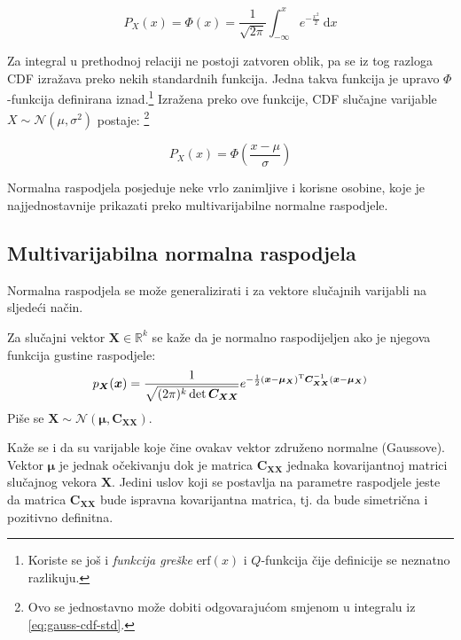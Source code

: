 \begin{equation} \label{eq:gauss-cdf-std}
  P_X(x) = \Phi(x)
  = \frac{1}{\sqrt{2\pi}} \int_{-\infty}^{x} e^{-\frac{x^2}{2}} \ \mathrm dx
\end{equation}

Za integral u prethodnoj relaciji ne postoji zatvoren oblik, pa se iz tog
razloga CDF izražava preko nekih standardnih funkcija. Jedna takva funkcija je
upravo $\Phi$-funkcija definirana iznad.\footnote{Koriste se još i
  \textit{funkcija greške} $\mathrm{erf}(x)$ i $Q$-funkcija čije definicije se
  neznatno razlikuju.} Izražena preko ove funkcije, CDF slučajne varijable $X
  \sim \mathcal{N}(\mu, \sigma^2)$ postaje: \footnote{Ovo se jednostavno može
    dobiti odgovarajućom smjenom u integralu iz \ref{eq:gauss-cdf-std}.}

\begin{equation}
  P_X(x) = \Phi\left(\frac{x-\mu}{\sigma}\right)
\end{equation}

Normalna raspodjela posjeduje neke vrlo zanimljive i korisne osobine, koje je
najjednostavnije prikazati preko multivarijabilne normalne raspodjele.

\subsection{Multivarijabilna normalna raspodjela} \label{sec:gauss-multi}

Normalna raspodjela se može generalizirati i za vektore slučajnih varijabli na
sljedeći način.

\begin{definition}

  Za slučajni vektor $\bm X \in \mathbb{R}^k$ se kaže da je normalno
  raspodijeljen ako je njegova funkcija gustine raspodjele:
  \begin{equation}
    p_{\bm X}(\bm x) 
    = \frac{1}{\sqrt{(2\pi)^k \det \bm C_{\bm X \bm X}}} e^{ -\frac{1}{2}(\bm x -
      \bm\mu_{\bm X})^\text T \bm C_{\bm X \bm X}^{-1} (\bm x - \bm\mu_{\bm X}) }
  \end{equation}
  Piše se $\bm X \sim \mathcal{N}(\bm\mu, \bm C_{\bm X\bm X})$.

\end{definition}

Kaže se i da su varijable koje čine ovakav vektor združeno normalne (Gaussove).
Vektor $\bm\mu$ je jednak očekivanju dok je matrica $\bm C_{\bm X\bm X}$ jednaka
kovarijantnoj matrici slučajnog vekora $\bm X$.  Jedini uslov koji se postavlja
na parametre raspodjele jeste da matrica $\bm C_{\bm X\bm X}$ bude ispravna
kovarijantna matrica, tj. da bude simetrična i pozitivno definitna. 

